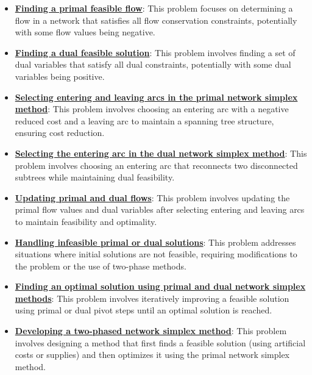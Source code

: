 \documentclass{article}%
\begin{document}
\begin{itemize}[leftmargin=*]
\item \href{https://www.math.purdue.edu/~yipn/421//2024-11-07-NetSimplex.pdf#page=2}{\textbf{Finding a primal feasible flow}}: This problem focuses on determining a flow in a network that satisfies all flow conservation constraints, potentially with some flow values being negative.%
\item \href{https://www.math.purdue.edu/~yipn/421//2024-11-07-NetSimplex.pdf#page=3}{\textbf{Finding a dual feasible solution}}: This problem involves finding a set of dual variables that satisfy all dual constraints, potentially with some dual variables being positive.%
\item \href{https://www.math.purdue.edu/~yipn/421//2024-11-07-NetSimplex.pdf#page=6}{\textbf{Selecting entering and leaving arcs in the primal network simplex method}}: This problem involves choosing an entering arc with a negative reduced cost and a leaving arc to maintain a spanning tree structure, ensuring cost reduction.%
\item \href{https://www.math.purdue.edu/~yipn/421//2024-11-07-NetSimplex.pdf#page=35}{\textbf{Selecting the entering arc in the dual network simplex method}}: This problem involves choosing an entering arc that reconnects two disconnected subtrees while maintaining dual feasibility.%
\item \href{https://www.math.purdue.edu/~yipn/421//2024-11-07-NetSimplex.pdf#page=6}{\textbf{Updating primal and dual flows}}: This problem involves updating the primal flow values and dual variables after selecting entering and leaving arcs to maintain feasibility and optimality.%
\item \href{https://www.math.purdue.edu/~yipn/421//2024-11-07-NetSimplex.pdf#page=2}{\textbf{Handling infeasible primal or dual solutions}}: This problem addresses situations where initial solutions are not feasible, requiring modifications to the problem or the use of two-phase methods.%
\item \href{https://www.math.purdue.edu/~yipn/421//2024-11-07-NetSimplex.pdf#page=5}{\textbf{Finding an optimal solution using primal and dual network simplex methods}}: This problem involves iteratively improving a feasible solution using primal or dual pivot steps until an optimal solution is reached.%
\item \href{https://www.math.purdue.edu/~yipn/421//2024-11-07-NetSimplex.pdf#page=45}{\textbf{Developing a two-phased network simplex method}}: This problem involves designing a method that first finds a feasible solution (using artificial costs or supplies) and then optimizes it using the primal network simplex method.%

\end{itemize}
\end{document}
